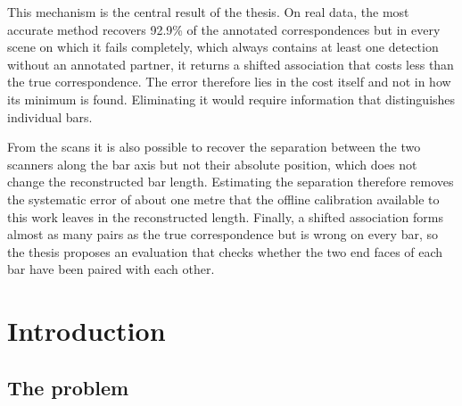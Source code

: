 \documentclass[a4paper, 12pt, twoside]{book}
\begin{document}
This mechanism is the central result of the thesis. On real data, the most accurate method recovers 92.9\% of the annotated correspondences but in every scene on which it fails completely, which always contains at least one detection without an annotated partner, it returns a shifted association that costs less than the true correspondence. The error therefore lies in the cost itself and not in how its minimum is found. Eliminating it would require information that distinguishes individual bars.

From the scans it is also possible to recover the separation between the two scanners along the bar axis but not their absolute position, which does not change the reconstructed bar length. Estimating the separation therefore removes the systematic error of about one metre that the offline calibration available to this work leaves in the reconstructed length. Finally, a shifted association forms almost as many pairs as the true correspondence but is wrong on every bar, so the thesis proposes an evaluation that checks whether the two end faces of each bar have been paired with each other.


\clearpage
\null
\clearpage


{\fontsize{12}{18}\selectfont\tableofcontents\par}
{\fontsize{12}{18}\selectfont\listoffigures\par}
{\fontsize{12}{18}\selectfont\listoftables\par}

\clearpage
\null
\clearpage


\newpage
\mainmatter
\pagestyle{fancy}
\fancyhead[L,R]{}
\fancyhead[C]{\nouppercase{\leftmark}}


\chapter{Introduction}
\label{ch:intro}

\section{The problem}
\label{sec:intro-problem}
\end{document}

